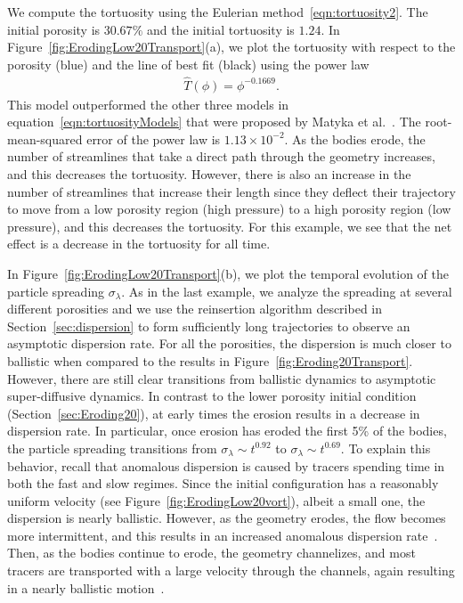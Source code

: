 \documentclass[preprint,10pt]{elsarticle}
\begin{document}
We compute the tortuosity using the Eulerian
method~\eqref{eqn:tortuosity2}.  The initial porosity is $30.67\%$ and
the initial tortuosity is $1.24$.  In
Figure~\ref{fig:ErodingLow20Transport}(a), we plot the tortuosity with
respect to the porosity (blue) and the line of best fit (black) using
the power law 
\begin{align}
  \widehat{T}(\phi) = \phi^{-0.1669}.
\end{align}
This model outperformed the other three models in
equation~\eqref{eqn:tortuosityModels} that were proposed by Matyka et
al.~\cite{mat-kha-koz2008}.  The root-mean-squared error of the power
law is $1.13 \times 10^{-2}$.  As the bodies erode, the number of
streamlines that take a direct path through the geometry increases,
and this decreases the tortuosity.  However, there is also an increase
in the number of streamlines that increase their length since they
deflect their trajectory to move from a low porosity region (high
pressure) to a high porosity region (low pressure), and this decreases
the tortuosity. For this example, we see that the net effect is a
decrease in the tortuosity for all time.

In Figure~\ref{fig:ErodingLow20Transport}(b), we plot the temporal
evolution of the particle spreading $\sigma_\lambda$.  As in the last
example, we analyze the spreading at several different porosities and we
use the reinsertion algorithm described in Section~\ref{sec:dispersion}
to form sufficiently long trajectories to observe an asymptotic
dispersion rate.  For all the porosities, the dispersion is much closer
to ballistic when compared to the results in
Figure~\ref{fig:Eroding20Transport}.  However, there are still clear
transitions from ballistic dynamics to asymptotic super-diffusive
dynamics.  In contrast to the lower porosity initial condition
(Section~\ref{sec:Eroding20}), at early times the erosion results in a
decrease in dispersion rate. In particular, once erosion has eroded the
first 5\% of the bodies, the particle spreading transitions from
$\sigma_\lambda \sim t^{0.92}$ to $\sigma_\lambda \sim t^{0.69}$.  To
explain this behavior, recall that anomalous dispersion is caused by
tracers spending time in both the fast and slow regimes.  Since the
initial configuration has a reasonably uniform velocity (see
Figure~\ref{fig:ErodingLow20vort}), albeit a small one, the dispersion
is nearly ballistic. However, as the geometry erodes, the flow becomes
more intermittent, and this results in an increased anomalous dispersion
rate~\cite{dea-leb-den-tar-bol-dav2013}.  Then, as the bodies continue
to erode, the geometry channelizes, and most tracers are transported
with a large velocity through the channels, again resulting in a nearly
ballistic motion~\cite{sie-ili-pri-riv-gua2019}.
\end{document}
